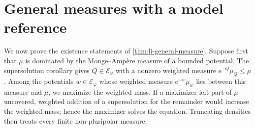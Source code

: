\section{General measures with a model reference}
\label{sec:big-model-general-measures}

We now prove the existence statements of \cref{thm:li-general-measure}. Suppose first that $\mu$ is dominated by the Monge--Amp\`ere measure of a bounded potential. The supersolution corollary gives $Q\in\mathcal E_\varphi$ with a nonzero weighted measure $\mathrm{e}^{-Q}\mu_Q\leq\mu$. Among the potentials $w\in\mathcal E_\varphi$ whose weighted measure $\mathrm{e}^{-w}\mu_w$ lies between this measure and $\mu$, we maximize the weighted mass. If a maximizer left part of $\mu$ uncovered, weighted addition of a supersolution for the remainder would increase the weighted mass; hence the maximizer solves the equation. Truncating densities then treats every finite non-pluripolar measure.

